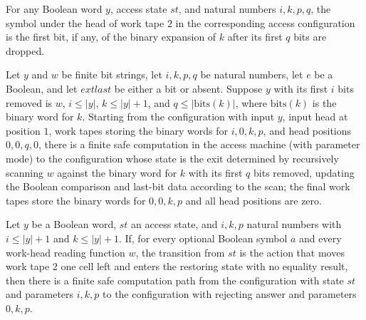 \begin{lemma}
\label{Complexity.LogProg.access_symbol}
\leanok
{}
For any Boolean word $y$, access state $st$, and natural numbers $i,k,p,q$, the symbol
under the head of work tape $2$ in the corresponding access configuration is the first
bit, if any, of the binary expansion of $k$ after its first $q$ bits are dropped.
\end{lemma}

\begin{lemma}
\label{Complexity.LogProg.access_tail_run}
\leanok
{}
Let $y$ and $w$ be finite bit strings, let $i,k,p,q$ be natural numbers, let $e$ be a
Boolean, and let $	ext{last}$ be either a bit or absent. Suppose $y$ with its first $i$
bits removed is $w$, $i\le |y|$, $k\le |y|+1$, and $q\le |\mathrm{bits}(k)|$, where
$\mathrm{bits}(k)$ is the binary word for $k$. Starting from the configuration with
input $y$, input head at position $1$, work tapes storing the binary words for
$i,0,k,p$, and head positions $0,0,q,0$, there is a finite safe computation in the
access machine (with parameter $\mathrm{mode}$) to the configuration whose state is the
exit determined by recursively scanning $w$ against the binary word for $k$ with its
first $q$ bits removed, updating the Boolean comparison and last-bit data according to
the scan; the final work tapes store the binary words for $0,0,k,p$ and all head
positions are zero.
\end{lemma}

\begin{lemma}
\label{Complexity.LogProg.access_reject}
\leanok
{}
Let $y$ be a Boolean word, $st$ an access state, and $i,k,p$ natural numbers with $i\le
|y|+1$ and $k\le |y|+1$. If, for every optional Boolean symbol $a$ and every work-head
reading function $w$, the transition from $st$ is the action that moves work tape $2$
one cell left and enters the restoring state with no equality result, then there is a
finite safe computation path from the configuration with state $st$ and parameters
$i,k,p$ to the configuration with rejecting answer and parameters $0,k,p$.
\end{lemma}

